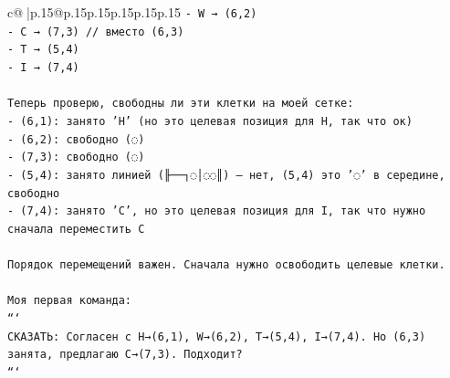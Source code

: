 \documentclass{article}
\begin{document}
{\begin{supertabular}{c@{$\;$}|p{.15\linewidth}@{}p{.15\linewidth}p{.15\linewidth}p{.15\linewidth}p{.15\linewidth}p{.15\linewidth}}
{{{\texttt{{-} W → (6,2)} \\
\texttt{{-} C → (7,3)  // вместо (6,3)} \\
\texttt{{-} T → (5,4)} \\
\texttt{{-} I → (7,4)} \\
\\ 
\texttt{Теперь проверю, свободны ли эти клетки на моей сетке:} \\
\texttt{{-} (6,1): занято 'H' (но это целевая позиция для H, так что ок)} \\
\texttt{{-} (6,2): свободно (◌)} \\
\texttt{{-} (7,3): свободно (◌)} \\
\texttt{{-} (5,4): занято линией (╟──┐◌│◌◌║) — нет, (5,4) это '◌' в середине, свободно} \\
\texttt{{-} (7,4): занято 'C', но это целевая позиция для I, так что нужно сначала переместить C} \\
\\ 
\texttt{Порядок перемещений важен. Сначала нужно освободить целевые клетки.} \\
\\ 
\texttt{Моя первая команда:} \\
\texttt{```} \\
\texttt{СКАЗАТЬ: Согласен с H→(6,1), W→(6,2), T→(5,4), I→(7,4). Но (6,3) занята, предлагаю C→(7,3). Подходит?} \\
\texttt{```} \\
            }
        }
    }
     \\ \\


\end{supertabular}}
\end{document}
